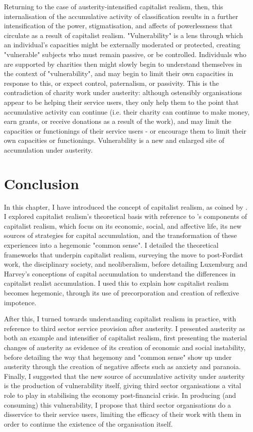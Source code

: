 Returning to the case of austerity-intensified capitalist realism, then, this internalisation of the accumulative activity of classification results in a further intensification of the power, stigmatisation, and affects of powerlessness that circulate as a result of capitalist realism. "Vulnerability" is a lens through which an individual's capacities might be externally moderated or protected, creating "vulnerable" subjects who must remain passive, or be controlled. Individuals who are supported by charities then might slowly begin to understand themselves in the context of "vulnerability", and may begin to limit their own capacities in response to this, or expect control, paternalism, or passivity. This is the contradiction of charity work under austerity: although ostensibly organisations appear to be helping their service users, they only help them to the point that accumulative activity can continue (i.e. their charity can continue to make money, earn grants, or receive donations as a result of the work), and may limit the capacities or functionings of their service users - or encourage them to limit their own capacities or functionings. Vulnerability is a new and enlarged site of accumulation under austerity.

\section{Conclusion}
In this chapter, I have introduced the concept of capitalist realism, as coined by \citet{fisher_capitalist_2009}. I explored capitalist realism's theoretical basis with reference to \citet{shonkwiler_reading_2014}'s components of capitalist realism, which focus on its economic, social, and affective life, its new sources of strategies for capital accumulation, and the transformation of these experiences into a hegemonic "common sense". I detailed the theoretical frameworks that underpin capitalist realism, surveying the move to post-Fordist work, the disciplinary society, and neoliberalism, before detailing Luxemburg and Harvey's conceptions of capital accumulation to understand the differences in capitalist realist accumulation. I used this to explain how capitalist realism becomes hegemonic, through its use of precorporation and creation of reflexive impotence. 

After this, I turned towards understanding capitalist realism in practice, with reference to third sector service provision after austerity. I presented austerity as both an example and intensifier of capitalist realism, first presenting the material changes of austerity as evidence of its creation of economic and social instability, before detailing the way that hegemony and "common sense" show up under austerity through the creation of negative affects such as anxiety and paranoia. Finally, I suggested that the new source of accumulative activity under austerity is the production of vulnerability itself, giving third sector organisations a vital role to play in stabilising the economy post-financial crisis. In producing (and consuming) this vulnerability, I propose that third sector organisations do a disservice to their service users, limiting the efficacy of their work with them in order to continue the existence of the organisation itself. 

